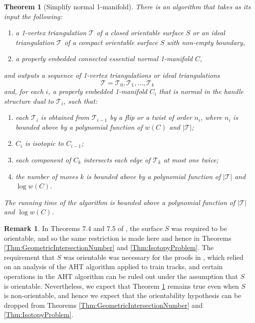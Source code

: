 \documentclass[oneside]{amsart}
\numberwithin{equation}{section}
\theoremstyle{plain}
\newtheorem{theorem}[equation]{Theorem}
\theoremstyle{definition}
\newtheorem{remark}[equation]{Remark}
\newcommand{\calT}{{\mathcal{T}}}
\begin{document}
\begin{theorem}[{\sc Simplify normal 1-manifold}]
\label{Thm:SimplifyNormal1Manifold}
There is an algorithm that takes as its input the following:
\begin{enumerate}
\item a 1-vertex triangulation $\mathcal{T}$ of a closed orientable surface $S$ or an ideal triangulation $\calT$ of a compact orientable surface $S$ with non-empty boundary,
\item a properly embedded connected essential normal 1-manifold $C$, 
\end{enumerate}
and outputs a sequence of 1-vertex triangulations or ideal triangulations 
$$\calT = \calT_0, \calT_1, \dots, \calT_k$$
and, for each $i$, a properly embedded 1-manifold $C_i$ that is normal in the handle structure dual to $\calT_i$, such that:
\begin{enumerate}
\item each $\calT_i$ is obtained from $\calT_{i-1}$ by a flip or a twist of order $n_i$, where $n_i$ is bounded above by a polynomial function of $w(C)$ and $|\calT|$;
\item $C_i$ is isotopic to $C_{i-1}$;
\item each component of $C_k$ intersects each edge of $\calT_k$ at most one twice;
\item the number of moves $k$ is bounded above by a polynomial function of $|\calT|$ and  $\log w(C)$.
\end{enumerate}
The running time of the algorithm is bounded above a polynomial function of $|\calT|$ and $\log w(C)$.
\end{theorem}


\begin{remark}
In Theorems 7.4 and 7.5 of \cite{LackenbyYazdi}, the surface $S$ was required to be orientable, and so the same restriction is made here and hence in Theorems 
\ref{Thm:GeometricIntersectionNumber} and \ref{Thm:IsotopyProblem}. The requirement that $S$ was orientable was necessary for the proofs in \cite{LackenbyYazdi}, which relied on an analysis of the AHT algorithm applied to train tracks, and certain operations in the AHT algorithm can be ruled out under the assumption that $S$ is orientable. Nevertheless, we expect that Theorem \ref{Thm:SimplifyNormal1Manifold} remains true even when $S$ is non-orientable, and hence we expect that the orientability hypothesis can be dropped from Theorems \ref{Thm:GeometricIntersectionNumber} and \ref{Thm:IsotopyProblem}.
\end{remark}
\end{document}
